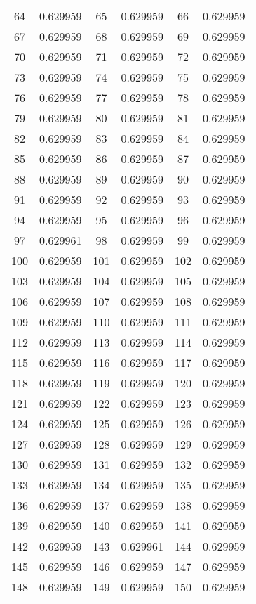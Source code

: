 \documentclass[12pt]{article}
\begin{document}
\begin{longtable}{@{}cc|cc|cc@{}}
64 & 0.629959 & 65 & 0.629959 & 66 & 0.629959 \\
67 & 0.629959 & 68 & 0.629959 & 69 & 0.629959 \\
70 & 0.629959 & 71 & 0.629959 & 72 & 0.629959 \\
73 & 0.629959 & 74 & 0.629959 & 75 & 0.629959 \\
76 & 0.629959 & 77 & 0.629959 & 78 & 0.629959 \\
79 & 0.629959 & 80 & 0.629959 & 81 & 0.629959 \\
82 & 0.629959 & 83 & 0.629959 & 84 & 0.629959 \\
85 & 0.629959 & 86 & 0.629959 & 87 & 0.629959 \\
88 & 0.629959 & 89 & 0.629959 & 90 & 0.629959 \\
91 & 0.629959 & 92 & 0.629959 & 93 & 0.629959 \\
94 & 0.629959 & 95 & 0.629959 & 96 & 0.629959 \\
97 & 0.629961 & 98 & 0.629959 & 99 & 0.629959 \\
100 & 0.629959 & 101 & 0.629959 & 102 & 0.629959 \\
103 & 0.629959 & 104 & 0.629959 & 105 & 0.629959 \\
106 & 0.629959 & 107 & 0.629959 & 108 & 0.629959 \\
109 & 0.629959 & 110 & 0.629959 & 111 & 0.629959 \\
112 & 0.629959 & 113 & 0.629959 & 114 & 0.629959 \\
115 & 0.629959 & 116 & 0.629959 & 117 & 0.629959 \\
118 & 0.629959 & 119 & 0.629959 & 120 & 0.629959 \\
121 & 0.629959 & 122 & 0.629959 & 123 & 0.629959 \\
124 & 0.629959 & 125 & 0.629959 & 126 & 0.629959 \\
127 & 0.629959 & 128 & 0.629959 & 129 & 0.629959 \\
130 & 0.629959 & 131 & 0.629959 & 132 & 0.629959 \\
133 & 0.629959 & 134 & 0.629959 & 135 & 0.629959 \\
136 & 0.629959 & 137 & 0.629959 & 138 & 0.629959 \\
139 & 0.629959 & 140 & 0.629959 & 141 & 0.629959 \\
142 & 0.629959 & 143 & 0.629961 & 144 & 0.629959 \\
145 & 0.629959 & 146 & 0.629959 & 147 & 0.629959 \\
148 & 0.629959 & 149 & 0.629959 & 150 & 0.629959 \\

\end{longtable}
\end{document}
